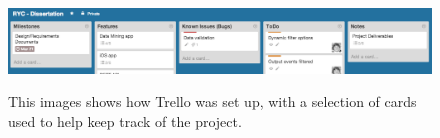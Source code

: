 		\begin{figure}[h] %
			\caption[Trello]{This images shows how Trello was set up, with a selection of cards used to help keep track of the project.}
			\centering
			\includegraphics[width=1\textwidth]{Images/trello}
			\label{fig:trello}
		\end{figure}